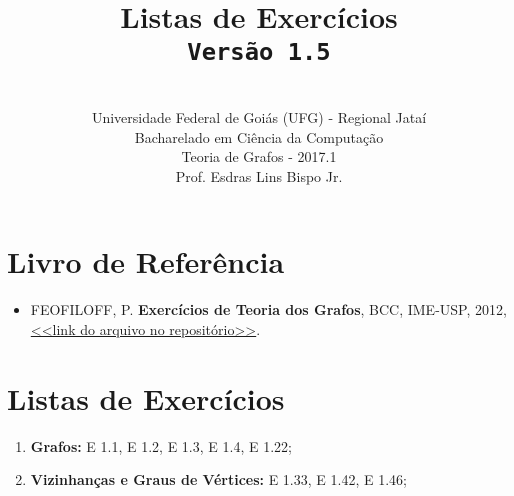 \documentclass[12pt,a4paper,oneside]{article}
\author{\\Universidade Federal de Goiás (UFG) - Regional Jataí\\Bacharelado em Ciência da Computação \\Teoria de Grafos - 2017.1 \\Prof. Esdras Lins Bispo Jr.}
\date{}
\title{
	\sc \huge Listas de Exercícios 
	\\{\tt Versão 1.5}
}
\begin{document}
\maketitle

\section{Livro de Referência}
	\begin{itemize}
		\item FEOFILOFF, P. {\bf Exercícios de Teoria dos Grafos}, BCC, IME-USP, 2012, \href{https://github.com/bispojr/grafos/raw/master/2017.1/arquivos/exercicios-grafos.pdf}{<<link do arquivo no repositório>>}.
	\end{itemize}
	
\section{Listas de Exercícios}

\begin{enumerate}

	\item[] {\bf Grafos:} E 1.1, E 1.2, E 1.3, E 1.4, E 1.22;
	\item[] {\bf Vizinhanças e Graus de Vértices:} E 1.33, E 1.42, E 1.46;

\end{enumerate}
\end{document}
